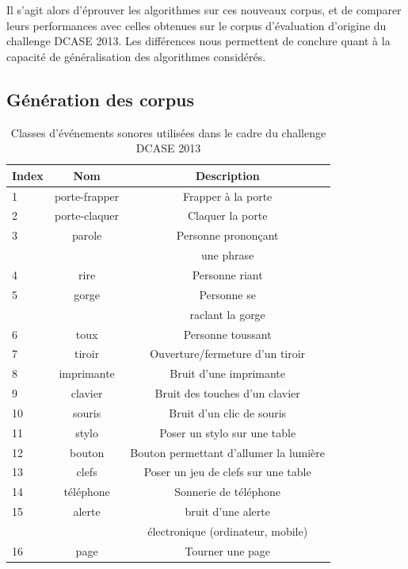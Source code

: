 Il s'agit alors d'éprouver les algorithmes sur ces nouveaux corpus, et de comparer leurs performances avec celles obtenues sur le corpus d'évaluation d'origine du challenge DCASE 2013. Les différences nous permettent de conclure quant à la capacité de généralisation des algorithmes considérés.

\subsection{Génération des corpus}

\begin{table}[t]
\begin{center}
\begin{tabular}{lcc}
\textbf{Index} & \textbf{Nom}  & \textbf{Description}  \\ 
\hline
1   & porte-frapper & Frapper à la porte \\
2   & porte-claquer & Claquer la porte \\
3   & parole        & Personne prononçant \\
    &               &  une phrase \\
4   & rire          & Personne riant  \\    
5   & gorge         & Personne se   \\
    &               & raclant la gorge \\
6   & toux          & Personne toussant \\
7   & tiroir        & Ouverture/fermeture d'un tiroir \\
8   & imprimante    & Bruit d'une imprimante \\
9   & clavier       & Bruit des touches d'un clavier \\
10  & souris        & Bruit d'un clic de souris \\
11  & stylo         & Poser un stylo sur une table \\
12  & bouton        & Bouton permettant d'allumer la lumière \\
13  & clefs         & Poser un jeu de clefs sur une table \\    
14  & téléphone     & Sonnerie de téléphone \\
15  & alerte        & bruit d'une alerte \\
    &               & électronique (ordinateur, mobile) \\
16  & page          & Tourner une page \\     
\hline      
\end{tabular}
\end{center}
\caption{Classes d'événements sonores utilisées  dans le cadre du challenge DCASE 2013}
\label{tab:eventDCASE2013}
\end{table}

